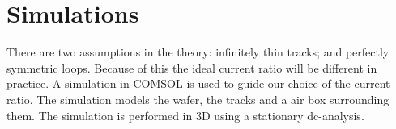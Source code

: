 \section{Simulations}
There are two assumptions in the theory: infinitely thin tracks; and perfectly symmetric loops. Because of this the ideal current ratio will be different in practice. A simulation in COMSOL is used to guide our choice of the current ratio. The simulation models the  wafer, the  tracks and a air box surrounding them. The simulation is performed in 3D using a stationary dc-analysis.
